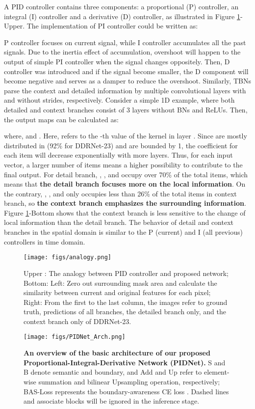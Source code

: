 \documentclass[10pt,twocolumn,letterpaper]{article}
\begin{document}
A PID controller contains three components: a proportional (P) controller, an integral (I) controller and a derivative (D) controller, as illustrated in Figure \ref{fig:pid_ana}-Upper. The implementation of PI controller could be written as:

P controller focuses on current signal, while I controller accumulates all the past signals. Due to the inertia effect of accumulation, overshoot will happen to the output of simple PI controller when the signal changes oppositely. Then, D controller was introduced and if the signal become smaller, the D component will become negative and serves as a damper to reduce the overshoot. Similarly, TBNs parse the context and detailed information by multiple convolutional layers with and without strides, respectively. Consider a simple 1D example, where both detailed and context branches consist of 3 layers without BNs and ReLUs. Then, the output maps can be calculated as:


where,  and . Here,  refers to the -th value of the kernel in layer . Since  are mostly distributed in  (92\% for DDRNet-23) and are bounded by 1, the coefficient for each item will decrease exponentially with more layers. Thus, for each input vector, a larger number of items means a higher possibility to contribute to the final output. For detail branch, , , and  occupy over 70\% of the total items, which means that \textbf{the detail branch focuses more on the local information}. On the contrary, , , and  only occupies less than 26\% of the total items in context branch, so \textbf{the context branch emphasizes the surrounding information}. Figure \ref{fig:pid_ana}-Bottom shows that the context branch is less sensitive to the change of local information than the detail branch. The behavior of detail and context branches in the spatial domain is similar to the P (current) and I (all previous) controllers in time domain.
\begin{figure}
\centering
    \texttt{[image: figs/analogy.png]}
\caption{Upper : The analogy between PID controller and proposed network;  Bottom: Left: Zero out surrounding mask area and calculate the similarity between current and original features for each pixel; Right: From the first to the last column, the images refer to ground truth, predictions of all branches, the detailed branch only, and the context branch only of DDRNet-23.}
\label{fig:pid_ana}
\end{figure}

\begin{figure*}
\centering
    \texttt{[image: figs/PIDNet\_Arch.png]}
\caption{\textbf{An overview of the basic architecture of our proposed Proportional-Integral-Derivative Network (PIDNet).} S and B denote semantic and boundary, and Add and Up refer to element-wise summation and bilinear Upsampling operation, respectively; BAS-Loss represents the boundary-awareness CE loss \cite{boundary-aware}. Dashed lines and associate blocks will be ignored in the inference stage.}
\label{fig:pidnet}
\end{figure*}
\end{document}
